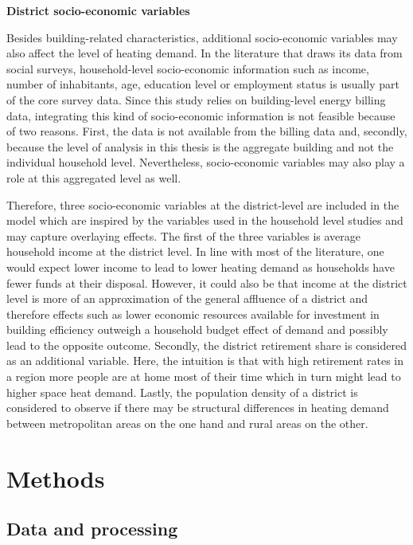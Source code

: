 \documentclass[12pt,twoside]{reedthesis}
\begin{document}
\textbf{District socio-economic variables}

Besides building-related characteristics, additional socio-economic variables may also affect the level of heating demand. In the literature that draws its data from social surveys, household-level socio-economic information such as income, number of inhabitants, age, education level or employment status is usually part of the core survey data. Since this study relies on building-level energy billing data, integrating this kind of socio-economic information is not feasible because of two reasons. First, the data is not available from the billing data and, secondly, because the level of analysis in this thesis is the aggregate building and not the individual household level. Nevertheless, socio-economic variables may also play a role at this aggregated level as well.

Therefore, three socio-economic variables at the district-level are included in the model which are inspired by the variables used in the household level studies and may capture overlaying effects. The first of the three variables is average household income at the district level. In line with most of the literature, one would expect lower income to lead to lower heating demand as households have fewer funds at their disposal. However, it could also be that income at the district level is more of an approximation of the general affluence of a district and therefore effects such as lower economic resources available for investment in building efficiency outweigh a household budget effect of demand and possibly lead to the opposite outcome. Secondly, the district retirement share is considered as an additional variable. Here, the intuition is that with high retirement rates in a region more people are at home most of their time which in turn might lead to higher space heat demand. Lastly, the population density of a district is considered to observe if there may be structural differences in heating demand between metropolitan areas on the one hand and rural areas on the other.

\hypertarget{methods}{%
\chapter{Methods}\label{methods}}

\hypertarget{data}{%
\section{Data and processing}\label{data}}
\end{document}
